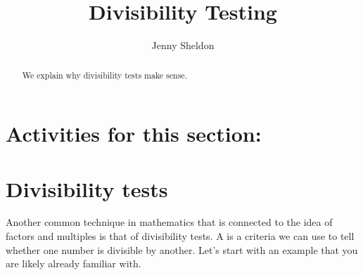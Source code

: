 \documentclass{ximera}
\title{Divisibility Testing}
\author{Jenny Sheldon}
\begin{document}
\begin{abstract}
We explain why divisibility tests make sense.
\end{abstract}
\maketitle

\section{Activities for this section:}

\section{Divisibility tests}

Another common technique in mathematics that is connected to the idea of factors and multiples is that of divisibility tests. A  is a criteria we can use to tell whether one number is divisible by another. Let's start with an example that you are likely already familiar with.
\end{document}

